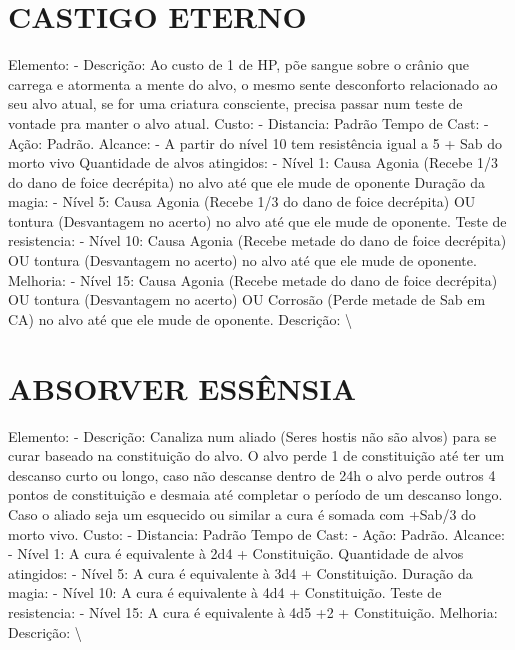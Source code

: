 \documentclass{article}%
\begin{document}
%
\section{CASTIGO ETERNO}%
\label{sec:CASTIGOETERNO}%
Elemento: {-} Descrição: Ao custo de 1 de HP, põe sangue sobre o crânio que carrega e atormenta a mente do alvo, o mesmo sente desconforto relacionado ao seu alvo atual, se for uma criatura consciente, precisa passar num teste de vontade pra manter o alvo atual.\newline%
Custo: {-} Distancia: Padrão\newline%
Tempo de Cast: {-} Ação: Padrão.\newline%
Alcance: {-} A partir do nível 10 tem resistência igual a 5 + Sab do morto vivo\newline%
Quantidade de alvos atingidos: {-} Nível 1: Causa Agonia (Recebe 1/3 do dano de foice decrépita) no alvo até que ele mude de oponente\newline%
Duração da magia: {-} Nível 5: Causa Agonia (Recebe 1/3 do dano de foice decrépita) OU tontura (Desvantagem no acerto) no alvo até que ele mude de oponente.\newline%
Teste de resistencia: {-} Nível 10: Causa Agonia (Recebe metade do dano de foice decrépita) OU tontura (Desvantagem no acerto) no alvo até que ele mude de oponente.\newline%
Melhoria: {-} Nível 15: Causa Agonia (Recebe metade do dano de foice decrépita) OU tontura (Desvantagem no acerto) OU Corrosão (Perde metade de Sab em CA) no alvo até que ele mude de oponente.\newline%
Descrição: \textbackslash{}

%
\section{ABSORVER ESSÊNSIA}%
\label{sec:ABSORVERESSNSIA}%
Elemento: {-} Descrição: Canaliza num aliado (Seres hostis não são alvos) para se curar baseado na constituição do alvo. O alvo perde 1 de constituição até ter um descanso curto ou longo, caso não descanse dentro de 24h o alvo perde outros 4 pontos de constituição e desmaia até completar o período de um descanso longo. Caso o aliado seja um esquecido ou similar a cura é somada com +Sab/3 do morto vivo.\newline%
Custo: {-} Distancia: Padrão\newline%
Tempo de Cast: {-} Ação: Padrão.\newline%
Alcance: {-} Nível 1: A cura é equivalente à 2d4 + Constituição.\newline%
Quantidade de alvos atingidos: {-} Nível 5: A cura é equivalente à 3d4 + Constituição.\newline%
Duração da magia: {-} Nível 10: A cura é equivalente à 4d4 + Constituição.\newline%
Teste de resistencia: {-} Nível 15: A cura é equivalente à 4d5 +2 + Constituição.\newline%
Melhoria: \newline%
Descrição: \textbackslash{}
\end{document}
